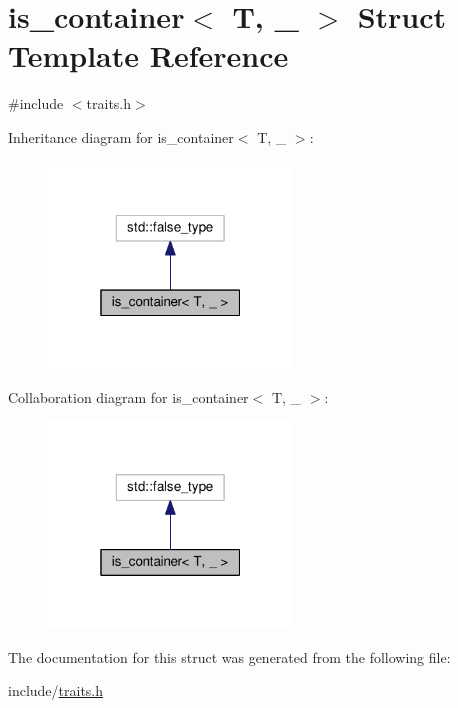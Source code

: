 \hypertarget{structis__container}{\section{is\-\_\-container$<$ T, \-\_\- $>$ Struct Template Reference}
\label{structis__container}
}


{\ttfamily \#include $<$traits.\-h$>$}



Inheritance diagram for is\-\_\-container$<$ T, \-\_\- $>$\-:
\nopagebreak
\begin{figure}[H]
\begin{center}
\leavevmode
\includegraphics[width=184pt]{structis__container__inherit__graph}
\end{center}
\end{figure}


Collaboration diagram for is\-\_\-container$<$ T, \-\_\- $>$\-:
\nopagebreak
\begin{figure}[H]
\begin{center}
\leavevmode
\includegraphics[width=184pt]{structis__container__coll__graph}
\end{center}
\end{figure}


The documentation for this struct was generated from the following file\-:\begin{DoxyCompactItemize}
\item 
include/\hyperlink{traits_8h}{traits.\-h}\end{DoxyCompactItemize}
